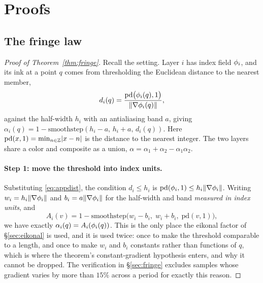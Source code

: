 \section{Proofs}
\label{app:proofs}

\subsection{The fringe law}
\label{app:fringe}

\begin{proof}[Proof of Theorem~\ref{thm:fringe}]
Recall the setting. Layer $i$ has index field
$\phi_i$, and its ink at a point $q$ comes from thresholding the Euclidean distance
to the nearest member,
\begin{equation}
  d_i(q)=\frac{\mathrm{pd}\big(\phi_i(q),1\big)}{\lVert\nabla\phi_i(q)\rVert},
  \label{eq:appdist}
\end{equation}
against the half-width $h_i$ with an antialiasing band $a$, giving
$\alpha_i(q)=1-\mathrm{smoothstep}(h_i-a,\,h_i+a,\,d_i(q))$. Here
$\mathrm{pd}(x,1)=\min_{n\in\mathbb{Z}}\lvert x-n\rvert$ is the distance to the nearest
integer. The two layers share a color and composite as a union,
$\alpha=\alpha_1+\alpha_2-\alpha_1\alpha_2$.

\paragraph{Step 1: move the threshold into index units.}
Substituting \eqref{eq:appdist}, the condition $d_i\le h_i$ is
$\mathrm{pd}(\phi_i,1)\le h_i\lVert\nabla\phi_i\rVert$. Writing
$w_i=h_i\lVert\nabla\phi_i\rVert$ and $b_i=a\lVert\nabla\phi_i\rVert$ for the
half-width and band \emph{measured in index units}, and
\begin{equation}
  A_i(v)=1-\mathrm{smoothstep}\big(w_i-b_i,\;w_i+b_i,\;\mathrm{pd}(v,1)\big),
  \label{eq:appprofile}
\end{equation}
we have exactly $\alpha_i(q)=A_i(\phi_i(q))$. This is the only place the eikonal
factor of \S\ref{sec:eikonal} is used, and it is used twice: once to make the
threshold comparable to a length, and once to make $w_i$ and $b_i$ constants
rather than functions of $q$, which is where the theorem's constant-gradient
hypothesis enters, and why it cannot be dropped. The verification in
\S\ref{sec:fringe} excludes samples whose gradient varies by more than $15\%$
across a period for exactly this reason.


\end{proof}
